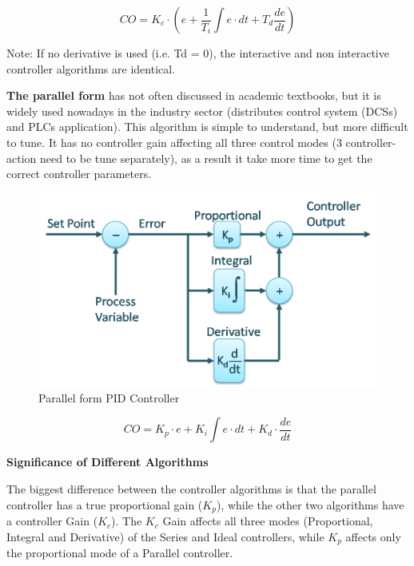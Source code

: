 \begin{equation}
	\label{eqn:2}
	CO = K_c\cdot\left(e + \frac{1}{T_i}\int e\cdot dt +T_d\frac{de}{dt} \right)
\end{equation}


Note: If no derivative is used (i.e. Td = 0), the interactive and non interactive controller algorithms are identical. 

\textbf{The parallel form} has not often discussed in academic textbooks, but it is widely used nowadays in the  industry sector (distributes control system (DCSs) and PLCs application). This algorithm is simple to understand, but more difficult to tune. It has no controller gain affecting all three control modes (3 controller-action need to be tune separately), as a result it take more time to get the correct controller parameters. 


\begin{figure}[H]
	\centering
	\includegraphics[width=0.8\columnwidth]{Figures/parallel.png}
	\caption[Short title]{Parallel form PID Controller \cite{PID}}
	\label{figure: Parallel PID}
\end{figure}

\begin{equation}
	\label{eqn:3}
	CO = K_p\cdot e + K_i\int e\cdot dt +K_d\cdot\frac{de}{dt}
\end{equation}

\textbf{Significance of Different Algorithms }

The biggest difference between the controller algorithms is that the parallel controller has a true proportional gain ($K_p$), while the other two algorithms have a controller Gain ($K_c$). The  $K_c$ Gain affects all three modes (Proportional, Integral and Derivative) of the Series and Ideal controllers, while $K_p$  affects only the proportional mode of a Parallel controller. 

